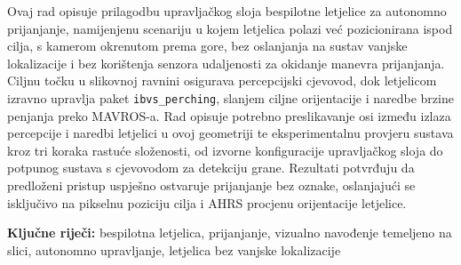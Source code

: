\noindent\textbf{\imeprezime}

\noindent\textbf{\naslovrada}

\bigskip

\noindent Ovaj rad opisuje prilagodbu upravljačkog sloja bespilotne letjelice za autonomno prijanjanje, namijenjenu scenariju u kojem letjelica polazi već pozicionirana ispod cilja, s kamerom okrenutom prema gore, bez oslanjanja na sustav vanjske lokalizacije i bez korištenja senzora udaljenosti za okidanje manevra prijanjanja. Ciljnu točku u slikovnoj ravnini osigurava percepcijski cjevovod, dok letjelicom izravno upravlja paket \texttt{ibvs\_perching}, slanjem ciljne orijentacije i naredbe brzine penjanja preko MAVROS-a. Rad opisuje potrebno preslikavanje osi između izlaza percepcije i naredbi letjelici u ovoj geometriji te eksperimentalnu provjeru sustava kroz tri koraka rastuće složenosti, od izvorne konfiguracije upravljačkog sloja do potpunog sustava s cjevovodom za detekciju grane. Rezultati potvrđuju da predloženi pristup uspješno ostvaruje prijanjanje bez oznake, oslanjajući se isključivo na pikselnu poziciju cilja i AHRS procjenu orijentacije letjelice.

\bigskip

\noindent\textbf{Ključne riječi:} bespilotna letjelica, prijanjanje, vizualno navođenje temeljeno na slici, autonomno upravljanje, letjelica bez vanjske lokalizacije
